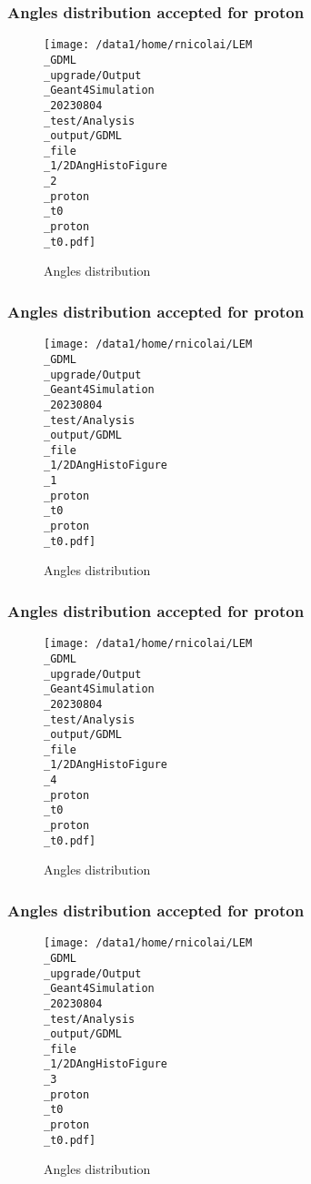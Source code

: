 \documentclass[8pt]{beamer}
\begin{document}
            \begin{frame}
                \frametitle{Angles distribution accepted for proton}
            
        \begin{figure}[h]
            \centering
            \texttt{[image: /data1/home/rnicolai/LEM\\\_GDML\\\_upgrade/Output\\\_Geant4Simulation\\\_20230804\\\_test/Analysis\\\_output/GDML\\\_file\\\_1/2DAngHistoFigure\\\_2\\\_proton\\\_t0\\\_proton\\\_t0.pdf]}
            \caption{Angles distribution}
        \end{figure}
        
            \end{frame}
            
            \begin{frame}
                \frametitle{Angles distribution accepted for proton}
            
        \begin{figure}[h]
            \centering
            \texttt{[image: /data1/home/rnicolai/LEM\\\_GDML\\\_upgrade/Output\\\_Geant4Simulation\\\_20230804\\\_test/Analysis\\\_output/GDML\\\_file\\\_1/2DAngHistoFigure\\\_1\\\_proton\\\_t0\\\_proton\\\_t0.pdf]}
            \caption{Angles distribution}
        \end{figure}
        
            \end{frame}
            
            \begin{frame}
                \frametitle{Angles distribution accepted for proton}
            
        \begin{figure}[h]
            \centering
            \texttt{[image: /data1/home/rnicolai/LEM\\\_GDML\\\_upgrade/Output\\\_Geant4Simulation\\\_20230804\\\_test/Analysis\\\_output/GDML\\\_file\\\_1/2DAngHistoFigure\\\_4\\\_proton\\\_t0\\\_proton\\\_t0.pdf]}
            \caption{Angles distribution}
        \end{figure}
        
            \end{frame}
            
            \begin{frame}
                \frametitle{Angles distribution accepted for proton}
            
        \begin{figure}[h]
            \centering
            \texttt{[image: /data1/home/rnicolai/LEM\\\_GDML\\\_upgrade/Output\\\_Geant4Simulation\\\_20230804\\\_test/Analysis\\\_output/GDML\\\_file\\\_1/2DAngHistoFigure\\\_3\\\_proton\\\_t0\\\_proton\\\_t0.pdf]}
            \caption{Angles distribution}
        \end{figure}
        
            \end{frame}
            
\end{document}
